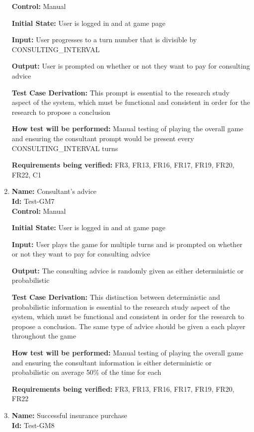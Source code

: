\documentclass[12pt, titlepage]{article}
\begin{document}
\begin{enumerate}
\textbf{Control:} Manual
					
\textbf{Initial State:} User is logged in and at game page
					
\textbf{Input:} User progresses to a turn number that is divisible by CONSULTING\_INTERVAL
					
\textbf{Output:} User is prompted on whether or not they want to pay for consulting advice

\textbf{Test Case Derivation:} This prompt is essential to the research study aspect of the system, which must be functional and consistent in order for the research to propose a conclusion

\textbf{How test will be performed:} Manual testing of playing the overall game and ensuring the consultant prompt would be present every CONSULTING\_INTERVAL turns

\textbf{Requirements being verified:} FR3, FR13, FR16, FR17, FR19, FR20, FR22, C1

\item{\textbf{Name:} Consultant's advice\\} %
\textbf{Id:} Test-GM7 \label{Test-GM7}\\

\textbf{Control:} Manual
					
\textbf{Initial State:} User is logged in and at game page
					
\textbf{Input:} User plays the game for multiple turns and is prompted on whether or not they want to pay for consulting advice
					
\textbf{Output:} The consulting advice is randomly given as either deterministic or probabilistic

\textbf{Test Case Derivation:} This distinction between deterministic and probabilistic information is essential to the research study aspect of the system, which must be functional and consistent in order for the research to propose a conclusion. The same type of advice should be given a each player throughout the game

\textbf{How test will be performed:} Manual testing of playing the overall game and ensuring the consultant information is either deterministic or probabilistic on average 50\% of the time for each

\textbf{Requirements being verified:} FR3, FR13, FR16, FR17, FR19, FR20, FR22

\item{\textbf{Name:} Successful insurance purchase\\} %
\textbf{Id:} Test-GM8 \label{Test-GM8}\\


\end{enumerate}
\end{document}
